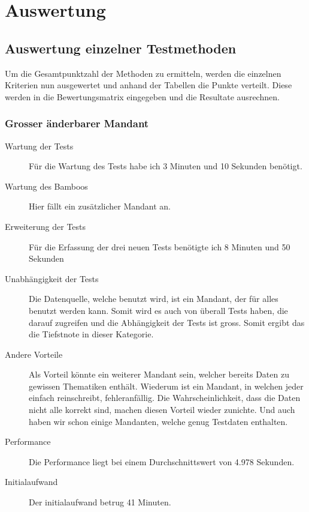 \section{Auswertung} \label{Auswertung}
\subsection{Auswertung einzelner Testmethoden}
Um die Gesamtpunktzahl der Methoden zu ermitteln, werden die einzelnen Kriterien nun ausgewertet und anhand der Tabellen die Punkte verteilt. Diese werden in die Bewertungsmatrix eingegeben und die Resultate ausrechnen.
\subsubsection{Grosser änderbarer Mandant}
\begin{description}
\item[Wartung der Tests] Für die Wartung des Tests habe ich 3 Minuten und 10 Sekunden benötigt.
\item[Wartung des Bamboos] Hier fällt ein zusätzlicher Mandant an.
\item[Erweiterung der Tests] Für die Erfassung der drei neuen Tests benötigte ich 8 Minuten und 50 Sekunden
\item[Unabhängigkeit der Tests] Die Datenquelle, welche benutzt wird, ist ein Mandant, der für alles benutzt werden kann. Somit wird es auch von überall Tests haben, die darauf zugreifen und die Abhängigkeit der Tests ist gross. Somit ergibt das die Tiefstnote in dieser Kategorie.
\item[Andere Vorteile] Als Vorteil könnte ein weiterer Mandant sein, welcher bereits Daten zu gewissen Thematiken enthält. Wiederum ist ein Mandant, in welchen jeder einfach reinschreibt, fehleranfällig. Die Wahrscheinlichkeit, dass die Daten nicht alle korrekt sind, machen diesen Vorteil wieder zunichte. Und auch haben wir schon einige Mandanten, welche genug Testdaten enthalten.
\item[Performance] Die Performance liegt bei einem Durchschnittswert von 4.978 Sekunden.
\item[Initialaufwand] Der initialaufwand betrug 41 Minuten. 
\end{description}
